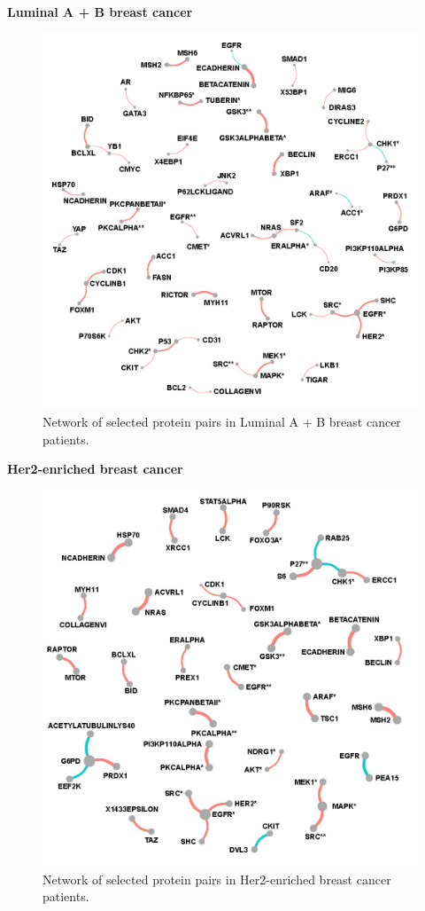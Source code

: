 \documentclass[
]{book}
\begin{document}
\textbf{Luminal A + B breast cancer}

\begin{figure}

{\centering \includegraphics[width=0.7\linewidth]{images/subtype_fullnet_lum} 

}

\caption{Network of selected protein pairs in Luminal A +  B breast cancer patients.}\label{fig:lumfullnet}
\end{figure}

\textbf{Her2-enriched breast cancer}

\begin{figure}

{\centering \includegraphics[width=0.7\linewidth]{images/subtype_fullnet_her2} 

}

\caption{Network of selected protein pairs in Her2-enriched breast cancer patients.}\label{fig:herfullnet}
\end{figure}
\end{document}
